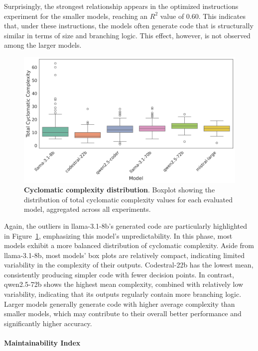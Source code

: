 \documentclass{DESSThesis}
\begin{document}
Surprisingly, the strongest relationship appears in the optimized instructions experiment for the smaller models, reaching an $R^2$ value of 0.60. This indicates that, under these instructions, the models often generate code that is structurally similar in terms of size and branching logic. This effect, however, is not observed among the larger models.

\begin{figure}[ht]
    \centering
    \includegraphics[width=0.65\linewidth]{img/Results/Second Experimental Phase/Cyclomatic Complexity Distribution per Model.png}
    \caption[Cyclomatic complexity distribution]{\textbf{Cyclomatic complexity distribution}. Boxplot showing the distribution of total cyclomatic complexity values for each evaluated model, aggregated across all experiments.}
    \label{fig:cyc_complexity_second}
\end{figure}

Again, the outliers in llama-3.1-8b's generated code are particularly highlighted in Figure~\ref{fig:cyc_complexity_second}, emphasizing this model's unpredictability. In this phase, most models exhibit a more balanced distribution of cyclomatic complexity. Aside from llama-3.1-8b, most models' box plots are relatively compact, indicating limited variability in the complexity of their outputs. Codestral-22b has the lowest mean, consistently producing simpler code with fewer decision points. In contrast, qwen2.5-72b shows the highest mean complexity, combined with relatively low variability, indicating that its outputs regularly contain more branching logic. Larger models generally generate code with higher average complexity than smaller models, which may contribute to their overall better performance and significantly higher accuracy.

\paragraph{Maintainability Index}\mbox{}\\
\end{document}
